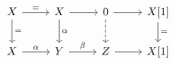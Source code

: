 \documentclass[12pt]{standalone}
\begin{document}
        $$

\begin{tikzcd}
X \arrow[r,"="] \arrow[d,"="] & X \arrow[r] \arrow[d,"\alpha"] & 0 \arrow[r] \arrow[d,dashed] & X[1] \arrow[d,"="] \\
X \arrow[r,"\alpha"] & Y \arrow[r,"\beta"] & Z \arrow[r] & X[1] 
\end{tikzcd}
        $$
        
\end{document}
